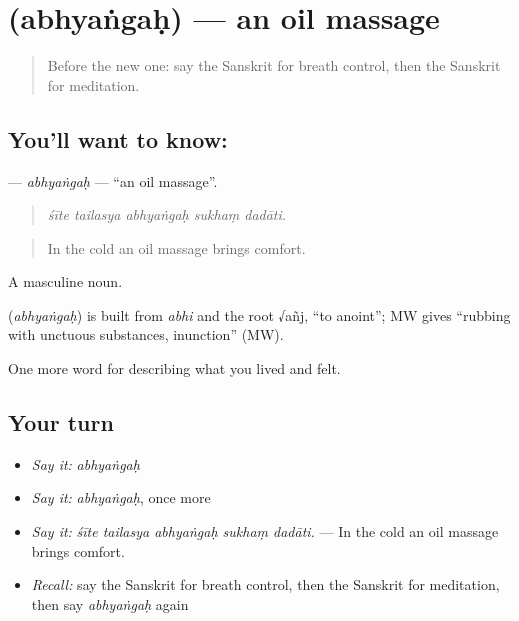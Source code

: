 \section[\texorpdfstring{\sk{अभ्यंगः} (abhyaṅgaḥ)}{अभ्यंगः (abhyaṅgaḥ)}]{ (abhyaṅgaḥ) — an oil massage}

\label{lesson:SA-C486-abhyangah}



\begin{quote}
Before the new one: say the Sanskrit for breath control, then the Sanskrit for meditation.
\end{quote}

\subsection*{You'll want to know: }
\textbf{} — \emph{abhyaṅgaḥ} — \textquotedblleft{}an oil massage\textquotedblright{}.

\begin{quote}
    
\end{quote}

\begin{quote}
\emph{śīte tailasya abhyaṅgaḥ sukhaṃ dadāti.}
\end{quote}

\begin{quote}
In the cold an oil massage brings comfort.
\end{quote}

A masculine noun.

\begin{cousinweb}
\textbf{} (\emph{abhyaṅgaḥ}) is built from \emph{abhi} and the root √añj, \textquotedblleft{}to anoint\textquotedblright{}; MW gives \textquotedblleft{}rubbing with unctuous substances, inunction\textquotedblright{} (MW).
\end{cousinweb}

\begin{grammarlens}[title={What you've built}]
One more word for describing what you lived and felt.
\end{grammarlens}

\subsection*{Your turn}
\begin{itemize}
\raggedright
  \item \emph{Say it:} \emph{abhyaṅgaḥ}
  \item \emph{Say it:} \emph{abhyaṅgaḥ}, once more
  \item \emph{Say it:} \emph{śīte tailasya abhyaṅgaḥ sukhaṃ dadāti.} — In the cold an oil massage brings comfort.
  \item \emph{Recall:} say the Sanskrit for breath control, then the Sanskrit for meditation, then say \emph{abhyaṅgaḥ} again
\end{itemize}

